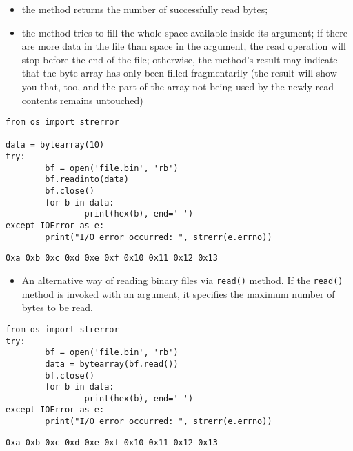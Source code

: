 \documentclass[11pt]{article}
\begin{document}
\begin{itemize}
\item the method returns the number of successfully read bytes;

\item the method tries to fill the whole space available inside its
argument; if there are more data in the file than space in the
argument, the read operation will stop before the end of the file;
otherwise, the method’s result may indicate that the byte array has
only been filled fragmentarily (the result will show you that, too,
and the part of the array not being used by the newly read contents
remains untouched)
\end{itemize}

\begin{verbatim}
from os import strerror

data = bytearray(10)
try:
        bf = open('file.bin', 'rb')
        bf.readinto(data)
        bf.close()
        for b in data:
                print(hex(b), end=' ')
except IOError as e:
        print("I/O error occurred: ", strerr(e.errno))
\end{verbatim}

\begin{verbatim}
0xa 0xb 0xc 0xd 0xe 0xf 0x10 0x11 0x12 0x13 
\end{verbatim}

\vspace{10 mm}

\begin{itemize}
\item An alternative way of reading binary files via \texttt{read()} method. If
the \texttt{read()} method is invoked with an argument, it specifies the
maximum number of bytes to be read.
\end{itemize}

\begin{verbatim}
from os import strerror
try:
        bf = open('file.bin', 'rb')
        data = bytearray(bf.read())
        bf.close()
        for b in data:
                print(hex(b), end=' ')
except IOError as e:
        print("I/O error occurred: ", strerr(e.errno))
\end{verbatim}

\begin{verbatim}
0xa 0xb 0xc 0xd 0xe 0xf 0x10 0x11 0x12 0x13 
\end{verbatim}

\newpage
\end{document}
